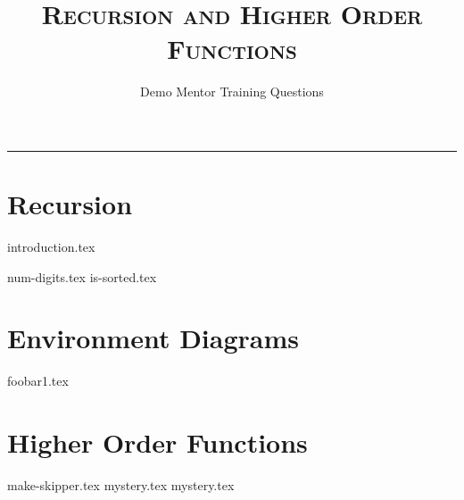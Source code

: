 \documentclass{exam}
\title{\textsc{Recursion and Higher Order Functions}}
\date{Demo Mentor Training Questions}
\begin{document}
\maketitle
\rule{\textwidth}{0.15em}
\fontsize{12}{15}\selectfont


\section{Recursion}
{introduction.tex}
\begin{questions}
{num-digits.tex}
\newpage
{is-sorted.tex}
\end{questions}

\newpage
\section{Environment Diagrams}
\begin{questions}
{foobar1.tex}

\newpage
\section{Higher Order Functions}
{make-skipper.tex}
{mystery.tex}
\newpage
{mystery.tex}
\end{questions}
\end{document}
